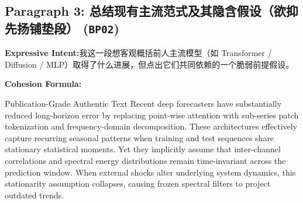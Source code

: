 \subsection*{Paragraph 3: 总结现有主流范式及其隐含假设（欲抑先扬铺垫段） (\texttt{BP02})}
\noindent\textbf{Expressive Intent:}\enspace 我这一段想客观概括前人主流模型（如 Transformer / Diffusion / MLP）取得了什么进展，但点出它们共同依赖的一个脆弱前提假设。\par
\noindent\textbf{Cohesion Formula:}\par\vspace{4pt}
\begin{ExampleBox}{Publication-Grade Authentic Text}
Recent deep forecasters have substantially reduced long-horizon error by replacing point-wise attention with sub-series patch tokenization and frequency-domain decomposition. These architectures effectively capture recurring seasonal patterns when training and test sequences share stationary statistical moments. Yet they implicitly assume that inter-channel correlations and spectral energy distributions remain time-invariant across the prediction window. When external shocks alter underlying system dynamics, this stationarity assumption collapses, causing frozen spectral filters to project outdated trends.
\end{ExampleBox}
